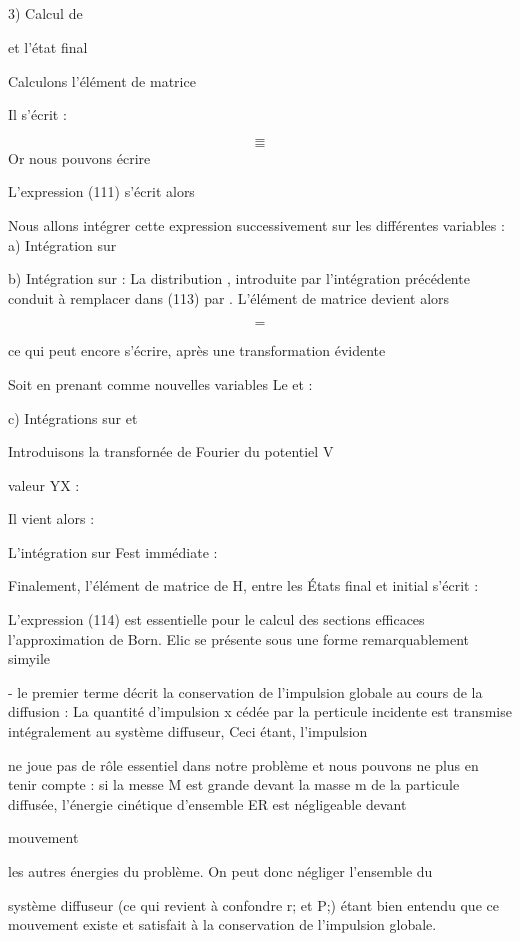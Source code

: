 \subsection{}%
3) Calcul de

et l'état final

Calculons l'élément de matrice 

Il s'écrit :
 
\[
\tag{112}=
\]
\[
\tag{113}=
\]
Or nous pouvons écrire

L'expression (111) s'écrit alors

Nous allons intégrer cette expression successivement sur les différentes variables :
a) Intégration sur

b) Intégration sur  :
La distribution , introduite par l'intégration précédente conduit à
remplacer dans (113)  par .
L'élément de matrice devient alors
 
\[
\tag{114}=
\]


ce qui peut encore s'écrire, après une transformation évidente

Soit en prenant comme nouvelles variables Le  et  :

c) Intégrations sur  et 

Introduisons la transfornée de Fourier du potentiel V

valeur YX :

Il vient alors :

L'intégration sur Fest immédiate :

Finalement, l'élément de matrice de H, entre les États final et initial s'écrit :

L'expression (114) est essentielle pour le calcul des sections efficaces  l'approximation
de Born. Elic se présente sous une forme remarquablement simyile

- le premier terme  décrit la conservation de l'impulsion globale au
cours de la diffusion : La quantité d'impulsion x cédée par la perticule incidente
est transmise intégralement au système diffuseur, Ceci étant, l'impulsion 


 ne joue pas de rôle essentiel dans notre problème et nous pouvons ne
plus en tenir compte : si la messe M est grande devant la masse m de la particule
diffusée, l'énergie cinétique d'ensemble ER est négligeable devant

mouvement

les autres énergies du problème. On peut donc négliger l'ensemble du

système diffuseur (ce qui revient à confondre r; et P;) étant bien entendu
que ce mouvement existe et satisfait à la conservation de l'impulsion globale.

